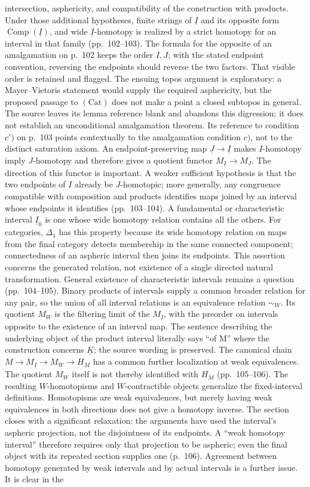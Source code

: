 \documentclass[10pt,oneside]{book}
\begin{document}
intersection, asphericity, and compatibility of the construction with products. Under those additional hypotheses, finite strings of $\underline I$ and its opposite form $\operatorname{Comp}(\underline I)$, and wide $\underline I$-homotopy is realized by a strict homotopy for an interval in that family (pp.~102--103). The formula for the opposite of an amalgamation on p.~102 keeps the order $I,J$; with the stated endpoint convention, reversing the endpoints should reverse the two factors. That visible order is retained and flagged. The ensuing topos argument is exploratory: a Mayer--Vietoris statement would supply the required asphericity, but the proposed passage to $(\mathrm{Cat})$ does not make a point a closed subtopos in general. The source leaves its lemma reference blank and abandons this digression; it does not establish an unconditional amalgamation theorem. Its reference to condition $c')$ on p.~103 points contextually to the amalgamation condition $c)$, not to the distinct saturation axiom. An endpoint-preserving map $\underline J\to\underline I$ makes $I$-homotopy imply $J$-homotopy and therefore gives a quotient functor $M_{\underline I}\to M_{\underline J}$. The direction of this functor is important. A weaker sufficient hypothesis is that the two endpoints of $I$ already be $J$-homotopic; more generally, any congruence compatible with composition and products identifies maps joined by an interval whose endpoints it identifies (pp.~103--104). A fundamental or characteristic interval $\underline I_0$ is one whose wide homotopy relation contains all the others. For categories, $\Delta_1$ has this property because its wide homotopy relation on maps from the final category detects membership in the same connected component; connectedness of an aspheric interval then joins its endpoints. This assertion concerns the generated relation, not existence of a single directed natural transformation. General existence of characteristic intervals remains a question (pp.~104--105). Binary products of intervals supply a common broader relation for any pair, so the union of all interval relations is an equivalence relation $\sim_W$. Its quotient $M_W$ is the filtering limit of the $M_{\underline I}$, with the preorder on intervals opposite to the existence of an interval map. The sentence describing the underlying object of the product interval literally says ``of M'' where the construction concerns $\underline K$; the source wording is preserved. The canonical chain $M\to M_{\underline I}\to M_W\to H_M$ has a common further localization at weak equivalences. The quotient $M_W$ itself is not thereby identified with $H_M$ (pp.~105--106). The resulting $W$-homotopisms and $W$-contractible objects generalize the fixed-interval definitions. Homotopisms are weak equivalences, but merely having weak equivalences in both directions does not give a homotopy inverse. The section closes with a significant relaxation: the arguments have used the interval's aspheric projection, not the disjointness of its endpoints. A ``weak homotopy interval'' therefore requires only that projection to be aspheric; even the final object with its repeated section supplies one (p.~106). Agreement between homotopy generated by weak intervals and by actual intervals is a further issue. It is clear in the 
\end{document}
